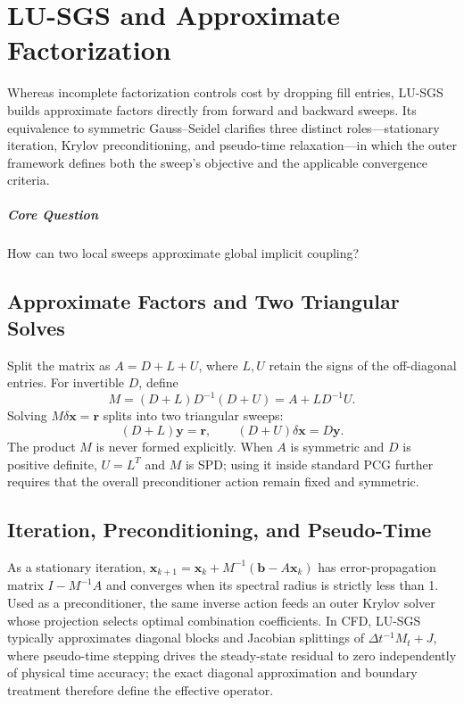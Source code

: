 \chapter{LU-SGS and Approximate Factorization}\label{v0ch:9}
\begin{chaptersummary}
Whereas incomplete factorization controls cost by dropping fill entries, LU-SGS builds approximate factors directly from forward and backward sweeps. Its equivalence to symmetric Gauss--Seidel clarifies three distinct roles—stationary iteration, Krylov preconditioning, and pseudo-time relaxation—in which the outer framework defines both the sweep's objective and the applicable convergence criteria.
\end{chaptersummary}
\paragraph{Core Question}How can two local sweeps approximate global implicit coupling?

\section{Approximate Factors and Two Triangular Solves}
Split the matrix as $A=D+L+U$, where $L,U$ retain the signs of the off-diagonal entries. For invertible $D$, define
\[
 M=(D+L)D^{-1}(D+U)
   =A+LD^{-1}U.
\]
Solving $M\delta\bm x=\bm r$ splits into two triangular sweeps:
\[
 (D+L)\bm y=\bm r,\qquad
 (D+U)\delta\bm x=D\bm y.
\]
The product $M$ is never formed explicitly. When $A$ is symmetric and $D$ is positive definite, $U=L^T$ and $M$ is SPD; using it inside standard PCG further requires that the overall preconditioner action remain fixed and symmetric.
\section{Iteration, Preconditioning, and Pseudo-Time}
As a stationary iteration, $\bm x_{k+1}=\bm x_k+M^{-1}(\bm b-A\bm x_k)$ has error-propagation matrix $I-M^{-1}A$ and converges when its spectral radius is strictly less than 1. Used as a preconditioner, the same inverse action feeds an outer Krylov solver whose projection selects optimal combination coefficients.
In CFD, LU-SGS typically approximates diagonal blocks and Jacobian splittings of $\Delta t^{-1}M_t+J$, where pseudo-time stepping drives the steady-state residual to zero independently of physical time accuracy; the exact diagonal approximation and boundary treatment therefore define the effective operator.
